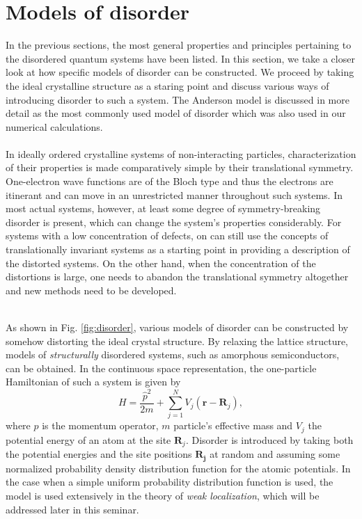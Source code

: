 \documentclass[10pt,a4paper]{article}
\begin{document}
\section{Models of disorder }
\label{sec:disorder}
In the previous sections, the most general properties and principles pertaining to the disordered quantum systems have been listed. In this section, we take a closer look at how specific models of disorder can be constructed. We proceed by taking the ideal crystalline structure as a staring point and discuss various ways of introducing disorder to such a system. The Anderson model is discussed in more detail as the most commonly used model of disorder which was also used in our numerical calculations. \\\\
\noindent
In ideally ordered crystalline systems of non-interacting particles, characterization of their properties is made comparatively simple by their translational symmetry. One-electron wave functions are of the Bloch type and thus the electrons are itinerant and can move in an unrestricted manner throughout such systems. In most actual systems, however, at least some degree of symmetry-breaking disorder is present, which can change the system's properties considerably. For systems with a low concentration of defects, on can still use the concepts of translationally invariant systems as a starting point in providing a description of the distorted systems. On the other hand, when the concentration of the distortions is large, one needs to abandon the translational symmetry altogether and new methods need to be developed. \\\\
\noindent  
\begin{minipage}[t]{0.6\textwidth}
\noindent As shown in Fig. \ref{fig:disorder}, various models of disorder can be constructed by somehow distorting the ideal crystal structure. By relaxing the lattice structure, models of \emph{structurally} disordered systems, such as amorphous semiconductors, can be obtained. In the continuous space representation, the one-particle Hamiltonian of such a system is given by
\begin{equation}\label{eq:amorphous_hamiltonian}
H=\frac{\hat{p}^2}{2m} + \sum\limits_{j=1}^N V_j(\mathbf{r}-\mathbf{R}_j),  
\end{equation}
where $\hat{p}$ is the momentum operator, $m$ particle's effective mass and $V_j$ the potential energy of an atom at the site $\mathbf{R}_j$. Disorder is introduced by taking both the potential energies and the site positions $\mathbf{R_j}$ at random and assuming some normalized probability density distribution function for the atomic potentials. In the case when a simple uniform probability distribution function is used, the model is used extensively in the theory of \emph{weak localization}, which will be addressed later in this seminar.
\end{minipage}\hfill
\end{document}
